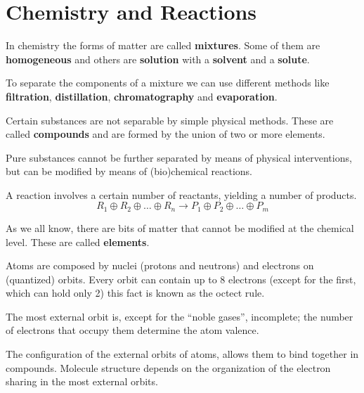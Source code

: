 \chapter{Chemistry and Reactions}
\begin{definition}
    In chemistry the forms of matter are called \textbf{mixtures}. Some of them
    are \textbf{homogeneous} and others are \textbf{solution} with a \textbf{solvent}
    and a \textbf{solute}.

    To separate the components of a mixture we can use different methods like
    \textbf{filtration}, \textbf{distillation}, \textbf{chromatography} and
    \textbf{evaporation}.
\end{definition}
\begin{definition}
    Certain substances are not separable by simple physical methods. These are
    called \textbf{compounds} and are formed by the union of two or more elements.
\end{definition}
\begin{definition}
    Pure substances cannot be further separated by means of physical interventions,
    but can be modified by means of (bio)chemical reactions.

    A reaction involves a certain number of reactants, yielding a number of products.
    \begin{equation}
        R_1 \oplus R_2 \oplus \ldots \oplus R_n \rightarrow P_1
        \oplus P_2 \oplus \ldots \oplus P_m
    \end{equation}

    As we all know, there are bits of matter that cannot be modified at the
    chemical level. These are called \textbf{elements}.
\end{definition}
\begin{definition}
    Atoms are composed by nuclei (protons and neutrons) and electrons on (quantized)
    orbits. Every orbit can contain up to 8 electrons (except for the first,
    which can hold only 2) this fact is known as the octect rule.

    The most external orbit is, except for the “noble gases”, incomplete; the
    number of electrons that occupy them determine the atom valence.
\end{definition}

The configuration of the external orbits of atoms, allows them to bind together
in compounds. Molecule structure depends on the organization of the electron
sharing in the most external orbits.

